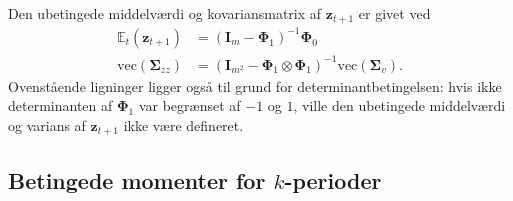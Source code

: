 \documentclass[
  a4paper,
  oneside]{memoir}
\begin{document}
\vspace{5mm}

Den ubetingede middelværdi og kovariansmatrix af \(\bm{z}_{t+1}\) er givet ved
\begin{align*}
        \mathbb{E}_t(\bm{z}_{t+1}) &= (\bm{I}_m-\bm{\Phi}_1)^{-1}\bm{\Phi}_0\\
        \text{vec}(\bm{\Sigma}_{zz}) &= (\bm{I}_{m^2}-\bm{\Phi}_1\otimes\bm{\Phi}_1)^{-1}\text{vec}(\bm{\Sigma}_v).
    \end{align*}
Ovenstående ligninger ligger også til grund for determinantbetingelsen: hvis ikke determinanten af \(\bm{\Phi}_1\) var begrænset af \(-1\) og \(1\), ville den ubetingede middelværdi og varians af \(\bm{z}_{t+1}\) ikke være defineret.

\subsection{Betingede momenter for $k$-perioder}
\end{document}
